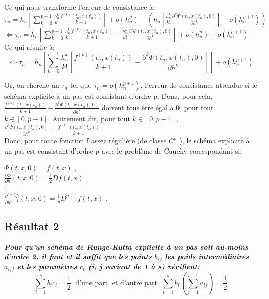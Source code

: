 \documentclass[a4paper,12pt,landscape]{article}
\begin{document}
Ce qui nous transforme l'erreur de consistance à:\\
$\tau_n = h_n [\sum^{p-1}_{k=0} \frac{h_{n}^{k}}{k!} \frac{f^{(k)} (t_n,x(t_{n}))}{k+1}] + o(h^p_n) - (h_n [\frac{h_{n}^{k}}{k!} \frac{\partial^{k} \Phi (t_n,x(t_{n}),0)}{\partial h^{k}} ] + o(h^{p+1}_n))$\\
$\Leftrightarrow \tau_n = h_n [\sum^{p-1}_{k=0} \frac{h_{n}^{k}}{k!} \frac{f^{(k)} (t_n,x(t_{n}))}{k+1} - \frac{h_{n}^{k}}{k!} \frac{\partial^{k} \Phi (t_n,x(t_{n}),0)}{\partial h^{k}}] + o(h^p_n)+ o(h^{p+1}_n)$\\

Ce qui résulte à:
\begin{equation}
\Leftrightarrow \tau_n = h_n [\sum^{p-1}_{k=0} \frac{h_{n}^{k}}{k!} [\frac{f^{(k)} (t_n,x(t_{n}))}{k+1} - \frac{\partial^{k} \Phi (t_n,x(t_{n}),0)}{\partial h^{k}}]] + o(h^{p+1}_n)
\end{equation}

Or, on cherche un $\tau_n$ tel que $\tau_n = o(h^{p+1}_n)$, l'erreur de consistance attendue si le schéma explicite à un pas est consistant d’ordre p. 
Donc, pour cela, $\frac{f^{(k)} (t_n,x(t_{n}))}{k+1} - \frac{\partial^{k} \Phi (t_n,x(t_{n}),0)}{\partial h^{k}}$ doivent tous être égal à $0$, pour tout $k \in [0,p-1]$.
Autrement dit, pour tout $k \in [0,p-1]$, $\frac{\partial^{k} \Phi (t_n,x(t_{n}),0)}{\partial h^{k}} = \frac{f^{(k)} (t_n,x(t_{n}))}{k+1} $.\\

Donc, pour toute fonction f assez régulière (de classe $C^{p}$ ), le schéma explicite à un pas est consistant d’ordre p avec le problème de Cauchy correspondant si:\\
\begin{center}
$\Phi (t,x,0) = f(t,x)$ ,  \\
$\frac{\partial \Phi}{\partial h} (t,x,0) = \frac{1}{2}Df(t,x)$ , \\
$\vdots$ \\
$\frac{\partial^{p-1}\Phi}{\partial h^{p-1}} (t,x,0) = \frac{1}{p}D^{p-1}f(t,x)$ , \\
\end{center}


\subsection{Résultat 2}
{\it \bf Pour qu’un schéma de Runge-Kutta explicite à un pas soit au-moins d’ordre 2, il faut et il suffit que les points $b_{i}$, les poids intermédiaires $a_{i,j}$ et les paramètres $c_{i}$ (i, j variant de 1 à s) vérifient:} $$\sum_{i=1}^{s}b_{i}c_{i} = \frac{1}{2} \; \textrm{   d'une part, et d'autre part   } \; \sum_{i=1}^{s}b_{i}\left(\sum_{j=1}^{i-1}a_{ij}\right)= \frac{1}{2}$$
\end{document}
